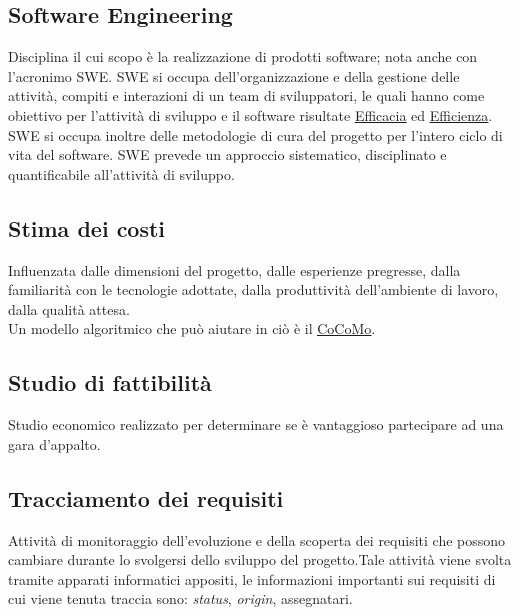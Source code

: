 	\subsection{Software Engineering}
	\label{sec:swe}
	Disciplina il cui scopo è la realizzazione di prodotti software; nota anche con l'acronimo SWE.
	SWE si occupa dell'organizzazione e della gestione delle attività, compiti e interazioni di un team di sviluppatori,
	le quali hanno come obiettivo per l'attività di sviluppo e il software risultate \underline{\hyperref[sec:efficacia]{Efficacia}} ed \underline{\hyperref[sec:efficienza]{Efficienza}}.	
	SWE si occupa inoltre delle metodologie di cura del progetto per l'intero ciclo di vita del software.
	SWE prevede un approccio sistematico, disciplinato e quantificabile all'attività di sviluppo.

	\subsection{Stima dei costi}
	\label{sec:stimacosti}
	Influenzata dalle dimensioni del progetto, dalle esperienze pregresse, dalla familiarità con le tecnologie adottate, dalla produttività dell'ambiente di lavoro, dalla qualità attesa. \\Un modello algoritmico che può aiutare in ciò è il \underline{\hyperref[sec:cocomo]{CoCoMo}}.

	\subsection{Studio di fattibilità}
	\label{sec:studiofattibilita}
	Studio economico realizzato per determinare se è vantaggioso partecipare ad una gara d'appalto.\newpage

	\subsection{Tracciamento dei requisiti}
	\label{sec:tracciamentorequisiti}
	Attività di monitoraggio dell'evoluzione e della scoperta dei requisiti che possono cambiare durante lo svolgersi dello sviluppo del progetto.Tale attività viene svolta tramite apparati informatici appositi, le informazioni importanti sui requisiti di cui viene tenuta traccia sono: \emph{status}, \emph{origin}, assegnatari.\newpage


